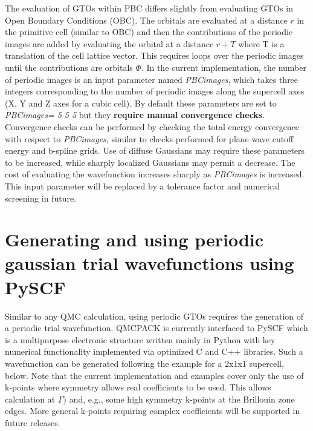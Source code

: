 The evaluation of GTOs within PBC differs slightly from evaluating
GTOs in Open Boundary Conditions (OBC).  The orbitals are evaluated at
a distance $r$ in the primitive cell (similar to OBC) and then the
contributions of the periodic images are added by evaluating the
orbital at a distance $r+T$ where T is a translation of the cell
lattice vector. This requires loops over the periodic images until the
contributions are orbitals $\Phi$. In the current implementation, the
number of periodic images is an input parameter named
\textit{PBCimages}, which takes three integers corresponding to the
number of periodic images along the supercell axes (X, Y and Z axes
for a cubic cell). By default these parameters are set to
\textit{PBCimages= 5 5 5} but they \textbf{require manual convergence
  checks}. Convergence checks can be performed by checking the total
energy convergence with respect to \textit{PBCimages}, similar to checks
performed for plane wave cutoff energy and b-spline grids. Use of
diffuse Gaussians may require these parameters to be increased, while
sharply localized Gaussians may permit a decrease. The cost of
evaluating the wavefunction increases sharply as \textit{PBCimages} is
increased. This input parameter will be replaced by a tolerance
factor and numerical screening in future.

\section{Generating and using periodic gaussian trial wavefunctions
  using PySCF}

Similar to any QMC calculation, using periodic GTOs requires the
generation of a periodic trial wavefunction. QMCPACK is currently
interfaced to PySCF which is a multipurpose electronic structure
written mainly in Python with key numerical functionality implemented
via optimized C and C++ libraries\cite{Sun2018}. Such a wavefunction
can be generated following the example for a 2x1x1 supercell,
below. Note that the current implementation and examples cover only
the use of k-points where symmetry allows real coefficients to be
used.  This allows calculation at $\Gamma$) and, e.g., some high
symmetry k-points at the Brillouin zone edges.  More general k-points
requiring complex coefficients will be supported in future releases.

